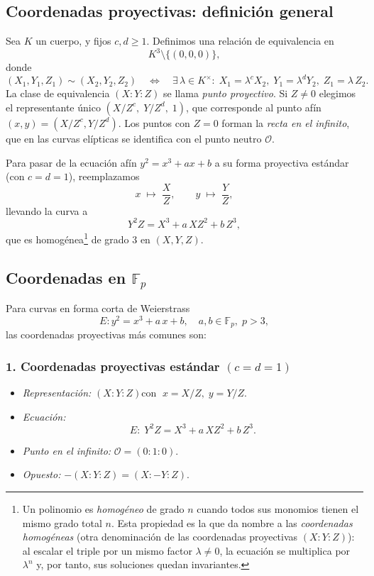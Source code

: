 \subsection{Coordenadas proyectivas: definición general}
\label{sec:coord-proyectivas}

Sea \(K\) un cuerpo, y fijos \(c,d\ge1\). Definimos una relación de equivalencia en
\[
  K^3 \setminus \{(0,0,0)\},
\]
donde
\[
  (X_1,Y_1,Z_1)\sim (X_2,Y_2,Z_2)
  \quad\Longleftrightarrow\quad
  \exists\,\lambda\in K^\times:
    \;X_1=\lambda^cX_2,\;
    Y_1=\lambda^dY_2,\;
    Z_1=\lambda\,Z_2.
\]
La clase de equivalencia \((X:Y:Z)\) se llama \emph{punto proyectivo}. Si \(Z\neq0\) elegimos el representante único \((X/Z^c,\;Y/Z^d,\;1)\), que corresponde al punto afín \((x,y)=(X/Z^c,Y/Z^d)\). Los puntos con \(Z=0\) forman la \emph{recta en el infinito}, que en las curvas elípticas se identifica con el punto neutro \(\mathcal{O}\).

Para pasar de la ecuación afín \(y^2 = x^3 + ax + b\) a su forma proyectiva estándar (con \(c=d=1\)), reemplazamos
\[
  x\;\mapsto\;\frac{X}{Z},\qquad y\;\mapsto\;\frac{Y}{Z},
\]
llevando la curva a
\[
  Y^2Z = X^3 + a\,X Z^2 + b\,Z^3,
\]
que es homogénea\footnote{Un polinomio es \emph{homogéneo} de grado \(n\) cuando todos sus monomios tienen el mismo grado total \(n\). Esta propiedad es la que da nombre a las \emph{coordenadas homogéneas} (otra denominación de las coordenadas proyectivas \((X:Y:Z)\)): al escalar el triple por un mismo factor \(\lambda\neq0\), la ecuación se multiplica por \(\lambda^n\) y, por tanto, sus soluciones quedan invariantes.} de grado 3 en \((X,Y,Z)\).

\subsection{\texorpdfstring{Coordenadas en $\mathbb{F}_p$}{Coordenadas en Fp}}\label{sec:proj_Fp}
Para curvas en forma corta de Weierstrass
\[
  E\colon y^2 = x^3 + a\,x + b,\quad a,b\in\mathbb{F}_p,\;p>3,
\]
las coordenadas proyectivas más comunes son:
\subsubsection*{1. Coordenadas proyectivas estándar \((c=d=1)\)}
\begin{itemize}
  \item \emph{Representación:} \((X:Y:Z)\)\quad con \(\;x = X/Z,\;y = Y/Z\).
  \item \emph{Ecuación:}
    \[
      E\colon\;Y^2Z = X^3 + a\,X Z^2 + b\,Z^3.
    \]
  \item \emph{Punto en el infinito:} \(\mathcal{O} = (0:1:0)\).
  \item \emph{Opuesto:} \(- (X:Y:Z) = (X:-Y:Z)\).
\end{itemize}

